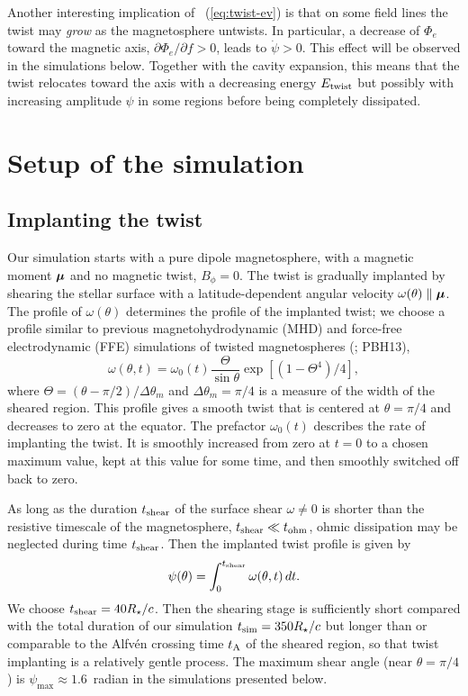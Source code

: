 Another interesting implication of \Eq~(\ref{eq:twist-ev}) is that on some field
lines the twist may {\it grow} as the magnetosphere untwists. In particular, a
decrease of $\Phi_e$ toward the magnetic axis, $\partial\Phi_e/\partial f>0$,
leads to $\dot{\psi}>0$. This effect will be observed in the simulations below.
Together with the cavity expansion, this means that the twist relocates toward
the axis with a decreasing energy $E_{\rm twist}$ but possibly
with
increasing amplitude $\psi$ in some regions before being completely dissipated.


\section{Setup of the simulation}
\label{sec:setup}

\subsection{Implanting the twist}
\label{sec:implant}

Our simulation starts with a pure dipole magnetosphere, with a magnetic moment
$\bm{\mu}$ and no magnetic twist, $B_\phi=0$. The twist is gradually
implanted by shearing the stellar surface with a latitude-dependent angular
velocity $\mathbf{\omega}(\theta)\parallel\bm{\mu}$. The profile of
$\omega(\theta)$ determines the profile of the implanted twist; we choose a
profile similar to previous magnetohydrodynamic (MHD) and force-free
electrodynamic (FFE) simulations of twisted magnetospheres
(\citealt{mikic_disruption_1994}; PBH13),
\begin{equation}
  \label{eq:twist-prof}
  \omega(\theta,t) = \omega_0(t)\frac{\Theta}{\sin\theta}\exp \left[ (1 - \Theta^4)/4 \right],
\end{equation}
where $\Theta = (\theta - \pi/2)/\Delta\theta_m$ and $\Delta \theta_m = \pi/4$
is a measure of the width of the sheared region. This profile gives a smooth
twist that is centered at $\theta=\pi/4$ and decreases to zero at the equator.
The prefactor $\omega_0(t)$ describes the rate of implanting the twist. It is
smoothly increased from zero at $t=0$ to a chosen maximum value, kept at this
value for some time, and then smoothly switched off back to zero.

As long as the duration $t_{\rm shear}$ of the surface shear $\omega\neq 0$ is shorter than
the resistive timescale of the magnetosphere, $t_{\rm shear}\ll t_{\rm ohm}$, ohmic dissipation
may be neglected during time $t_{\rm shear}$. Then the implanted twist profile is given
by
\begin{equation}
  \psi(\theta)=\int_0^{t_{\rm shear}}\omega(\theta,t)\,dt.
\end{equation}
We choose $t_{\rm shear}=40 R_\star/c$. Then the shearing stage is sufficiently short
compared with the total duration of our simulation $t_\mathrm{sim} = 350R_\star/c$
but longer than or comparable to the Alfv\'en crossing time $t_{\rm A}$ of the sheared
region, so that twist implanting is a relatively gentle process. The maximum
shear angle (near $\theta=\pi/4$) is $\psi_{\max}\approx 1.6$~radian in the
simulations presented below.

